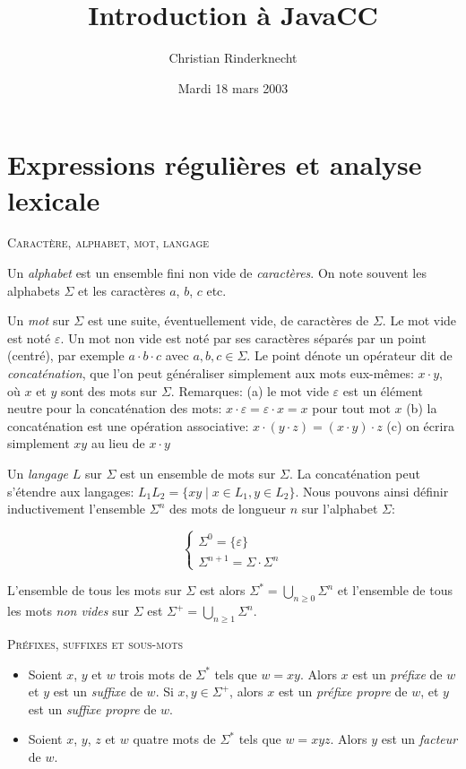 \documentclass[11pt,a4paper]{article}
\title{Introduction à JavaCC}
\author{Christian Rinderknecht}
\date{Mardi 18 mars 2003}
\begin{document}
\maketitle

\section{Expressions régulières et analyse lexicale}

\noindent
\textsc{Caractère, alphabet, mot, langage}

Un \emph{alphabet} est un ensemble fini non vide de
\emph{caractères}. On note souvent les alphabets $\Sigma$ et les
caractères $a$, $b$, $c$ etc.

Un \emph{mot} sur $\Sigma$ est une suite, éventuellement vide, de
caractères de $\Sigma$. Le mot vide est noté $\varepsilon$. Un mot non
vide est noté par ses caractères séparés par un point (centré), par
exemple $a \cdot b \cdot c$ avec $a, b, c \in \Sigma$. Le point dénote
un opérateur dit de \emph{concaténation}, que l'on peut généraliser
simplement aux mots eux-mêmes: $x \cdot y$, où $x$ et $y$ sont des
mots sur $\Sigma$. Remarques: (a) le mot vide $\varepsilon$ est un
élément neutre pour la concaténation des mots: $x \cdot \varepsilon =
\varepsilon \cdot x = x$ pour tout mot $x$ (b) la concaténation est
une opération associative: $x \cdot (y \cdot z) = (x \cdot y) \cdot z$
(c) on écrira simplement $xy$ au lieu de $x \cdot y$

Un \emph{langage} $L$ sur $\Sigma$ est un ensemble de mots sur
$\Sigma$. La concaténation peut s'étendre aux langages: $L_1 L_2
= \{xy \mid x \in L_1, y \in L_2\}$. Nous pouvons ainsi définir
inductivement l'ensemble $\Sigma^{n}$ des mots de longueur $n$ sur
l'alphabet $\Sigma$:

\[
\left\{
  \begin{array}{l}
    \Sigma^{0} = \{\varepsilon\}\\
    \Sigma^{n+1} = \Sigma \cdot \Sigma^{n}
  \end{array}
\right.
\]

L'ensemble de tous les mots sur $\Sigma$ est alors $\Sigma^{*} =
\bigcup_{n \geq 0}{\Sigma^{n}}$ et l'ensemble de tous les mots
\emph{non vides} sur $\Sigma$ est $\Sigma^{+} = \bigcup_{n \geq
1}{\Sigma^{n}}$.

\noindent
\textsc{Préfixes, suffixes et sous-mots}

\begin{itemize}

  \item Soient $x$, $y$ et $w$ trois mots de $\Sigma^{*}$ tels que $w
        = xy$. Alors $x$ est un \emph{préfixe} de $w$ et $y$ est un
        \emph{suffixe} de $w$. Si $x, y \in \Sigma^{+}$, alors $x$ est
        un \emph{préfixe propre} de $w$, et $y$ est un \emph{suffixe
        propre} de $w$.

  \item Soient $x$, $y$, $z$ et $w$ quatre mots de $\Sigma^{*}$ tels
        que $w = xyz$. Alors $y$ est un \emph{facteur} de $w$.

\end{itemize}
\end{document}
